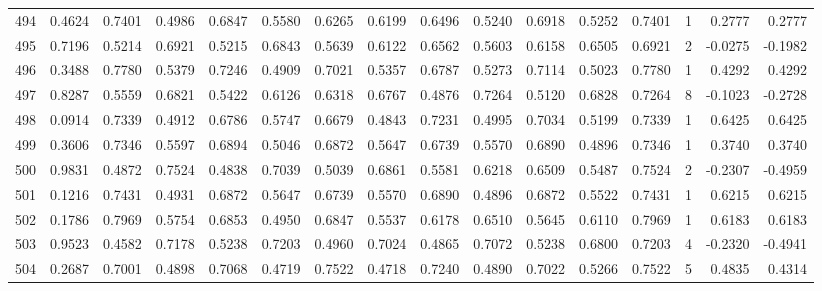 \begin{tabular}{lrrrrrrrrrrrrrrr}
494 &      0.4624 &  0.7401 &  0.4986 &  0.6847 &  0.5580 &  0.6265 &  0.6199 &  0.6496 &  0.5240 &  0.6918 &   0.5252 &     0.7401 &      1 &                    0.2777 &                     0.2777 \\
495 &      0.7196 &  0.5214 &  0.6921 &  0.5215 &  0.6843 &  0.5639 &  0.6122 &  0.6562 &  0.5603 &  0.6158 &   0.6505 &     0.6921 &      2 &                   -0.0275 &                    -0.1982 \\
496 &      0.3488 &  0.7780 &  0.5379 &  0.7246 &  0.4909 &  0.7021 &  0.5357 &  0.6787 &  0.5273 &  0.7114 &   0.5023 &     0.7780 &      1 &                    0.4292 &                     0.4292 \\
497 &      0.8287 &  0.5559 &  0.6821 &  0.5422 &  0.6126 &  0.6318 &  0.6767 &  0.4876 &  0.7264 &  0.5120 &   0.6828 &     0.7264 &      8 &                   -0.1023 &                    -0.2728 \\
498 &      0.0914 &  0.7339 &  0.4912 &  0.6786 &  0.5747 &  0.6679 &  0.4843 &  0.7231 &  0.4995 &  0.7034 &   0.5199 &     0.7339 &      1 &                    0.6425 &                     0.6425 \\
499 &      0.3606 &  0.7346 &  0.5597 &  0.6894 &  0.5046 &  0.6872 &  0.5647 &  0.6739 &  0.5570 &  0.6890 &   0.4896 &     0.7346 &      1 &                    0.3740 &                     0.3740 \\
500 &      0.9831 &  0.4872 &  0.7524 &  0.4838 &  0.7039 &  0.5039 &  0.6861 &  0.5581 &  0.6218 &  0.6509 &   0.5487 &     0.7524 &      2 &                   -0.2307 &                    -0.4959 \\
501 &      0.1216 &  0.7431 &  0.4931 &  0.6872 &  0.5647 &  0.6739 &  0.5570 &  0.6890 &  0.4896 &  0.6872 &   0.5522 &     0.7431 &      1 &                    0.6215 &                     0.6215 \\
502 &      0.1786 &  0.7969 &  0.5754 &  0.6853 &  0.4950 &  0.6847 &  0.5537 &  0.6178 &  0.6510 &  0.5645 &   0.6110 &     0.7969 &      1 &                    0.6183 &                     0.6183 \\
503 &      0.9523 &  0.4582 &  0.7178 &  0.5238 &  0.7203 &  0.4960 &  0.7024 &  0.4865 &  0.7072 &  0.5238 &   0.6800 &     0.7203 &      4 &                   -0.2320 &                    -0.4941 \\
504 &      0.2687 &  0.7001 &  0.4898 &  0.7068 &  0.4719 &  0.7522 &  0.4718 &  0.7240 &  0.4890 &  0.7022 &   0.5266 &     0.7522 &      5 &                    0.4835 &                     0.4314 \\

\end{tabular}
